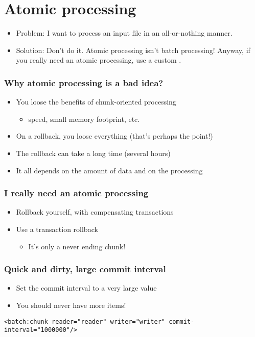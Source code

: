 \section{Atomic processing}

\begin{frame}
 \begin{itemize}
  \item Problem: I want to process an input file in an all-or-nothing manner.
  \item Solution: Don't do it. Atomic processing isn't batch processing! Anyway, if you really need 
  an atomic processing, use a custom .
 \end{itemize}
\end{frame}

\begin{frame}
 \frametitle{Why atomic processing is a bad idea?}
 \begin{itemize}
  \item You loose the benefits of chunk-oriented processing
  \begin{itemize}
    \item speed, small memory footprint, etc.
  \end{itemize}
  \item On a rollback, you loose everything (that's perhaps the point!)
  \item The rollback can take a long time (several hours)
  \item It all depends on the amount of data and on the processing
 \end{itemize}
\end{frame}

\begin{frame}
 \frametitle{I really need an atomic processing}
 \begin{itemize}
  \item Rollback yourself, with compensating transactions  
  \item Use a transaction rollback
  \begin{itemize}
    \item It's only a never ending chunk!
  \end{itemize}
 \end{itemize}
\end{frame}

\begin{frame}[fragile]
 \frametitle{Quick and dirty, large commit interval}
 \begin{itemize}
  \item Set the commit interval to a very large value  
  \item You should never have more items!
 \end{itemize}
 \lstset{language=XML}
\begin{lstlisting}
<batch:chunk reader="reader" writer="writer" commit-interval="1000000"/>
\end{lstlisting}
\end{frame}

